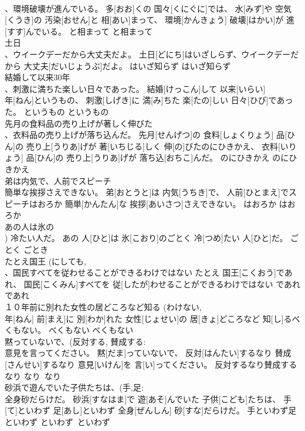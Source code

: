 \documentclass[8pt]{extreport}
\begin{document}
\begin{CJK}{UTF8}{min}
\\	、環境破壊が進んでいる。	多[おお]くの 国々[くにぐに]では、 水[みず]や 空気[くうき]の 汚染[おせん]と 相[あい]まって、 環境[かんきょう] 破壊[はかい]が 進[すす]んでいる。	と相まって	と相まって	
\\	土日 
\\	、ウイークデーだから大丈夫だよ。	土日[どにち]はいざしらず、ウイークデーだから 大丈夫[だいじょうぶ]だよ。	はいざ知らず	はいざ知らず	
\\	結婚して以来30年 
\\	、刺激に満ちた楽しい日々であった。	結婚[けっこん]して 以来[いらい] 
\\	年[ねん]というもの、 刺激[しげき]に 満[み]ちた 楽[たの]しい 日々[ひび]であった。	というもの	というもの	
\\	先月の食料品の売り上げが著しく伸びた 
\\	、衣料品の売り上げが落ち込んだ。	先月[せんげつ]の 食料[しょくりょう] 品[ひん]の 売り上[うりあ]げが 著[いちじる]しく 伸[の]びたのにひきかえ、 衣料[いりょう] 品[ひん]の 売り上[うりあ]げが 落ち込[おちこ]んだ。	のにひきかえ	のにひきかえ	
\\	弟は内気で、人前でスピーチ 
\\	簡単な挨拶さえできない。	弟[おとうと]は 内気[うちき]で、 人前[ひとまえ]でスピーチはおろか 簡単[かんたん]な 挨拶[あいさつ]さえできない。	はおろか	はおろか	
\\	あの人は氷の 
\\	[書き言葉]) 冷たい人だ。	あの 人[ひと]は 氷[こおり]のごとく 冷[つめ]たい 人[ひと]だ。	ごとく	ごとき	
\\	たとえ国王 (にしても, 
\\	、国民すべてを従わせることができるわけではない	たとえ 国王[こくおう]であれ、 国民[こくみん]すべてを 従[したが]わせることができるわけではない	であれ	であれ	
\\	１０年前に別れた女性の居どころなど知る (わけない, 
\\	年[ねん] 前[まえ]に 別[わか]れた 女性[じょせい]の 居[きょ]どころなど 知[し]るべくもない。	べくもない	べくもない	
\\	黙っていないで、(反対する, 賛成する: 
\\	意見を言ってください。	黙[だま]っていないで、 反対[はんたい]するなり 賛成[さんせい]するなり 意見[いけん]を 言[い]ってください。	反対するなり賛成するなり	なり~なり	
\\	砂浜で遊んでいた子供たちは、(手,足: 
\\	全身砂だらけだ。	砂浜[すなはま]で 遊[あそ]んでいた 子供[こども]たちは、 手[て]といわず 足[あし]といわず 全身[ぜんしん] 砂[すな]だらけだ。	手といわず足といわず	といわず~といわず	

\end{CJK}
\end{document}
